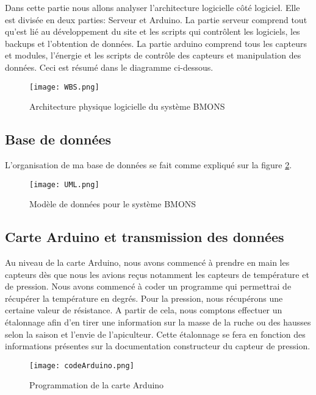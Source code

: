 \vspace{1.5cm}
Dans cette partie nous allons analyser l'architecture logicielle côté logiciel. Elle est divisée en deux parties: Serveur et Arduino. La partie serveur comprend tout qu'est lié au développement du site et les scripts qui contrôlent les logiciels, les backups et l'obtention de données. La partie arduino comprend tous les capteurs et modules, l'énergie et les scripts de contrôle des capteurs et manipulation des données. Ceci est résumé dans le diagramme ci-dessous. 


\begin{figure}[h!]
\centering\texttt{[image: WBS.png]}
\caption{\label{fig:SDP} Architecture physique logicielle du système BMONS}
\end{figure}

\clearpage

\subsection{Base de données}

L'organisation de ma base de données se fait comme expliqué sur la figure \ref{fig:UML}.
\begin{figure}[h!]
\centering\texttt{[image: UML.png]}
\caption{\label{fig:UML} Modèle de données pour le système BMONS}
\end{figure}

\clearpage

\subsection{Carte Arduino et transmission des données}

Au niveau de la carte Arduino, nous avons commencé à prendre en main les capteurs dès que nous les avions reçus notamment les capteurs de température et de pression. Nous avons commencé à coder un programme qui permettrai de récupérer la température en degrés. Pour la pression, nous récupérons une certaine valeur de résistance. A partir de cela, nous comptons effectuer un étalonnage afin d'en tirer une information sur la masse de la ruche ou des hausses selon la saison et l'envie de l'apiculteur. Cette étalonnage se fera en fonction des informations présentes sur la documentation constructeur du capteur de pression. \\

\begin{figure}[h!]
\centering\texttt{[image: codeArduino.png]}
\caption{\label{fig:code} Programmation de la carte Arduino}
\end{figure}  

\clearpage
